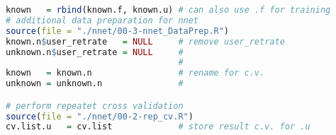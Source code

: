 \documentclass[10pt,a4paper]{article}
\begin{document}
\begin{lstlisting}[language=r]
known   = rbind(known.f, known.u) # can also use .f for training
# additional data preparation for nnet
source(file = "./nnet/00-3-nnet_DataPrep.R")
known.n$user_retrate   = NULL     # remove user_retrate
unknown.n$user_retrate = NULL     #
                                  #
known   = known.n                 # rename for c.v.
unknown = unknown.n               #

# perform repeatet cross validation
source(file = "./nnet/00-2-rep_cv.R")
cv.list.u   = cv.list             # store result c.v. for .u

\end{lstlisting}
\end{document}
